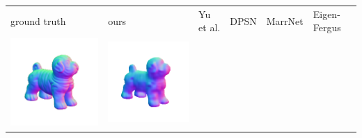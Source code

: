 \begin{center}
\begin{tabularx}{\linewidth}{@{}Y@{}Y@{}Y@{}Y@{}Y@{}Y@{}}
ground truth & ours & Yu et al. & DPSN & MarrNet & Eigen-Fergus \\
\includegraphics[width=\linewidth]{semisynthetic/20150514_17_gt.png} &
\includegraphics[width=\linewidth]{semisynthetic/20150514_17_ours_out.png} &

\end{tabularx}
\end{center}
